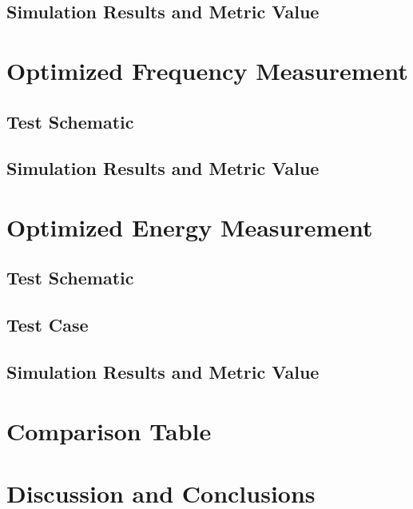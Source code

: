 \documentclass[12pt]{article}
\begin{document}
\newpage

\subsection{Simulation Results and Metric Value}



\newpage

\section{Optimized Frequency Measurement}
\subsection{Test Schematic}



\newpage

\subsection{Simulation Results and Metric Value}



\newpage

\section{Optimized Energy Measurement}
\subsection{Test Schematic}



\newpage

\subsection{Test Case}



\newpage

\subsection{Simulation Results and Metric Value}



\newpage

\section{Comparison Table}



\newpage

\section{Discussion and Conclusions}
\end{document}
